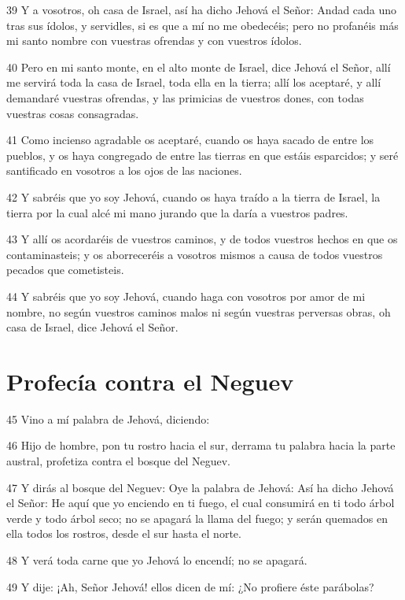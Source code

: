 \par 39 Y a vosotros, oh casa de Israel, así ha dicho Jehová el Señor: Andad cada uno tras sus ídolos, y servidles, si es que a mí no me obedecéis; pero no profanéis más mi santo nombre con vuestras ofrendas y con vuestros ídolos.
\par 40 Pero en mi santo monte, en el alto monte de Israel, dice Jehová el Señor, allí me servirá toda la casa de Israel, toda ella en la tierra; allí los aceptaré, y allí demandaré vuestras ofrendas, y las primicias de vuestros dones, con todas vuestras cosas consagradas.
\par 41 Como incienso agradable os aceptaré, cuando os haya sacado de entre los pueblos, y os haya congregado de entre las tierras en que estáis esparcidos; y seré santificado en vosotros a los ojos de las naciones.
\par 42 Y sabréis que yo soy Jehová, cuando os haya traído a la tierra de Israel, la tierra por la cual alcé mi mano jurando que la daría a vuestros padres.
\par 43 Y allí os acordaréis de vuestros caminos, y de todos vuestros hechos en que os contaminasteis; y os aborreceréis a vosotros mismos a causa de todos vuestros pecados que cometisteis.
\par 44 Y sabréis que yo soy Jehová, cuando haga con vosotros por amor de mi nombre, no según vuestros caminos malos ni según vuestras perversas obras, oh casa de Israel, dice Jehová el Señor.

\section*{Profecía contra el Neguev}

\par 45 Vino a mí palabra de Jehová, diciendo:
\par 46 Hijo de hombre, pon tu rostro hacia el sur, derrama tu palabra hacia la parte austral, profetiza contra el bosque del Neguev.
\par 47 Y dirás al bosque del Neguev: Oye la palabra de Jehová: Así ha dicho Jehová el Señor: He aquí que yo enciendo en ti fuego, el cual consumirá en ti todo árbol verde y todo árbol seco; no se apagará la llama del fuego; y serán quemados en ella todos los rostros, desde el sur hasta el norte.
\par 48 Y verá toda carne que yo Jehová lo encendí; no se apagará.
\par 49 Y dije: ¡Ah, Señor Jehová! ellos dicen de mí: ¿No profiere éste parábolas?

